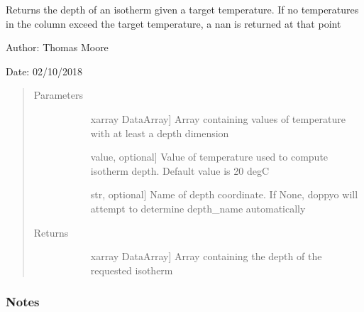 \documentclass[letterpaper,10pt,english]{sphinxmanual}
\begin{document}
\begin{fulllineitems}
\label{\detokenize{diagnostic_doc:diagnostic.isotherm_depth}}
Returns the depth of an isotherm given a target temperature. If no temperatures in the column
exceed the target temperature, a nan is returned at that point

\begin{DUlineblock}{0em}
\item[] Author: Thomas Moore
\item[] Date: 02/10/2018
\end{DUlineblock}
\begin{quote}\begin{description}
\item[{Parameters}] \leavevmode\begin{description}
\item[{}] \leavevmode{[}xarray DataArray{]}
Array containing values of temperature with at least a depth dimension

\item[{}] \leavevmode{[}value, optional{]}
Value of temperature used to compute isotherm depth. Default value is 20 degC

\item[{}] \leavevmode{[}str, optional{]}
Name of depth coordinate. If None, doppyo will attempt to determine depth\_name                     automatically

\end{description}

\item[{Returns}] \leavevmode\begin{description}
\item[{}] \leavevmode{[}xarray DataArray{]}
Array containing the depth of the requested isotherm

\end{description}

\end{description}\end{quote}
\subsubsection*{Notes}


\end{fulllineitems}
\end{document}

